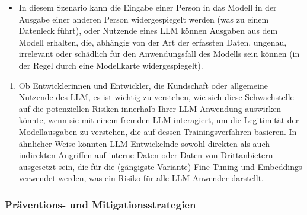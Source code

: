 \documentclass[
]{article}
\providecommand{\tightlist}{%
  \setlength{\itemsep}{0pt}\setlength{\parskip}{0pt}}
\begin{document}
\begin{itemize}
\tightlist
\item
  In diesem Szenario kann die Eingabe einer Person in das Modell in der
  Ausgabe einer anderen Person widergespiegelt werden (was zu einem
  Datenleck führt), oder Nutzende eines LLM können Ausgaben aus dem
  Modell erhalten, die, abhängig von der Art der erfassten Daten,
  ungenau, irrelevant oder schädlich für den Anwendungsfall des Modells
  sein können (in der Regel durch eine Modellkarte widergespiegelt).
\end{itemize}

\begin{enumerate}
\def\labelenumi{\arabic{enumi}.}
\setcounter{enumi}{5}
\tightlist
\item
  Ob Entwicklerinnen und Entwickler, die Kundschaft oder allgemeine
  Nutzende des LLM, es ist wichtig zu verstehen, wie sich diese
  Schwachstelle auf die potenziellen Risiken innerhalb Ihrer
  LLM-Anwendung auswirken könnte, wenn sie mit einem fremden LLM
  interagiert, um die Legitimität der Modellausgaben zu verstehen, die
  auf dessen Trainingsverfahren basieren. In ähnlicher Weise könnten
  LLM-Entwickelnde sowohl direkten als auch indirekten Angriffen auf
  interne Daten oder Daten von Drittanbietern ausgesetzt sein, die für
  die (gängigste Variante) Fine-Tuning und Embeddings verwendet werden,
  was ein Risiko für alle LLM-Anwender darstellt.
\end{enumerate}

\subsubsection{Präventions- und
Mitigationsstrategien}\label{pruxe4ventions--und-mitigationsstrategien}
\end{document}
